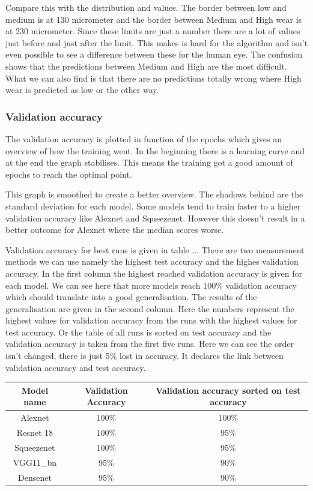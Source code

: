 	Compare this with the distribution and values. The border between low and medium is at 130 micrometer and the border between Medium and High wear is at 230 micrometer. Since these limits are just a number there are a lot of values just before and just after the limit. This makes is hard for the algorithm and isn't even possible to see a difference between these for the human eye. The confusion shows that the predictions between Medium and High are the most difficult. What we can also find is that there are no predictions totally wrong where High wear is predicted as low or the other way.
	


	\subsubsection{Validation accuracy}
		The validation accuracy is plotted in function of the epochs which gives an overview of how the training went. In the beginning there is a learning curve and at the end the graph stabilises. This means the training got a good amount of epochs to reach the optimal point.

		This graph is smoothed to create a better overview. The shadows behind are the standard deviation for each model. Some models tend to train faster to a higher validation accuracy like Alexnet and Squeezenet. However this doesn't result in a better outcome for Alexnet where the median scores worse. 

		Validation accuracy for best runs is given in table ... There are two measurement methods we can use namely the highest test accuracy and the highes validation accuracy. In the first column the highest reached validation accuracy is given for each model. We can see here that more models reach 100\% validation accuracy which should translate into a good generalisation. The results of the generalisation are given in the second column. Here the numbers represent the highest values for validation accuracy from the runs with the highest values for test accuracy. Or the table of all runs is sorted on test accuracy and the validation accuracy is taken from the first five runs. Here we can see the order isn't changed, there is just 5\% lost in accuracy. It declares the link between validation accuracy and test accuracy. 
		\begin{center}
			\begin{tabular}{ c | c c }
			Model name		& Validation Accuracy 	& Validation accuracy sorted on test accuracy	\\ \hline
		 	Alexnet 				& 100\%						& 100\% 				\\ 
		 	Resnet 18 			& 100\%						& 95\%					\\
		 	Squeezenet 		& 100\%						& 95\%					\\
		 	VGG11\_bn			& 95\%							& 90\%					\\
		 	Densenet			& 95\%							& 90\%					\\
			\end{tabular}
		\end{center}

